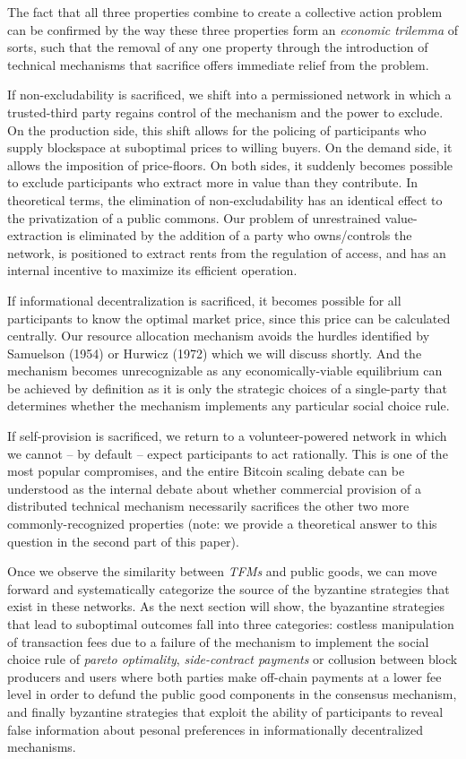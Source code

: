 \documentclass[sigconf,anonymous]{aamas}
\begin{document}
The fact that all three properties combine to create a collective action problem can be confirmed by the way these three properties form an \textit{economic trilemma} of sorts, such that the removal of any one property through the introduction of technical mechanisms that sacrifice offers immediate relief from the problem.

If non-excludability is sacrificed, we shift into a permissioned network in which a trusted-third party regains control of the mechanism and the power to exclude. On the production side, this shift allows for the policing of participants who supply blockspace at suboptimal prices to willing buyers. On the demand side, it allows the imposition of price-floors. On both sides, it suddenly becomes possible to exclude participants who extract more in value than they contribute. In theoretical terms, the elimination of non-excludability has an identical effect to the privatization of a public commons. Our problem of unrestrained value-extraction is eliminated by the addition of a party who owns/controls the network, is positioned to extract rents from the regulation of access, and has an internal incentive to maximize its efficient operation.

If informational decentralization is sacrificed, it becomes possible for all participants to know the optimal market price, since this price can be calculated centrally. Our resource allocation mechanism avoids the hurdles identified by Samuelson (1954) or Hurwicz (1972) which we will discuss shortly. And the mechanism becomes unrecognizable as any economically-viable equilibrium can be achieved by definition as it is only the strategic choices of a single-party that determines whether the mechanism implements any particular social choice rule.

If self-provision is sacrificed, we return to a volunteer-powered network in which we cannot -- by default -- expect participants to act rationally. This is one of the most popular compromises, and the entire Bitcoin scaling debate can be understood as the internal debate about whether commercial provision of a distributed technical mechanism necessarily sacrifices the other two more commonly-recognized properties (note: we provide a theoretical answer to this question in the second part of this paper).

Once we observe the similarity between \textit{TFMs} and public goods, we can move forward and systematically categorize the source of the byzantine strategies that exist in these networks. As the next section will show, the byazantine strategies that lead to suboptimal outcomes fall into three categories: costless manipulation of transaction fees due to a failure of the mechanism to implement the social choice rule of \textit{pareto optimality}, \textit{side-contract payments} or collusion between block producers and users where both parties make off-chain payments at a lower fee level in order to defund the public good components in the consensus mechanism, and finally byzantine strategies that exploit the ability of participants to reveal false information about pesonal preferences in informationally decentralized mechanisms.
\end{document}
